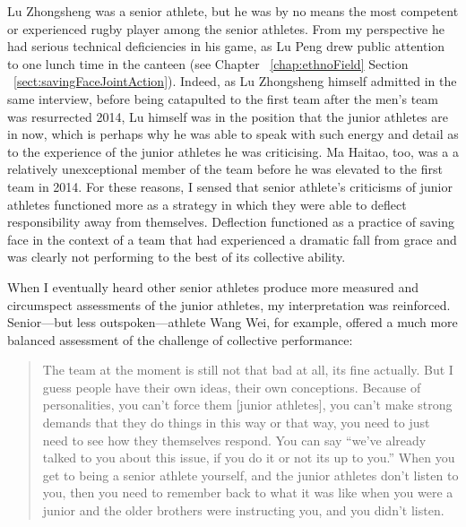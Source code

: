 \begin{CJK}{UTF8}{gbsn}
Lu Zhongsheng was a senior athlete, but he was by no means the most competent or experienced rugby player among the senior athletes.  From my perspective he had serious technical deficiencies in his game, as Lu Peng drew public attention to one lunch time in the canteen (see Chapter ~\ref{chap:ethnoField} Section ~\ref{sect:savingFaceJointAction}).  Indeed, as Lu Zhongsheng himself admitted in the same interview, before being catapulted to the first team after the men's team was resurrected 2014, Lu himself was in the position that the junior athletes are in now, which is perhaps why he was able to speak with such energy and detail as to the experience of the junior athletes he was criticising.  Ma Haitao, too, was a a relatively unexceptional member of the team before he was elevated to the first team in 2014.  For these reasons, I sensed that senior athlete's criticisms of junior athletes functioned more as a strategy in which they were able to deflect responsibility away from themselves.  Deflection functioned as a practice of saving face in the context of a team that had experienced a dramatic fall from grace and was clearly not performing to the best of its collective ability.


When I eventually heard other senior athletes produce more measured and circumspect assessments of the junior athletes, my interpretation was reinforced.  Senior---but less outspoken---athlete Wang Wei, for example, offered a much more balanced assessment of the challenge of collective performance:

\begin{quote}
   The team at the moment is still not that bad at all, its fine actually.  But I guess people have their own ideas, their own conceptions.  Because of personalities, you can't force them [junior athletes], you can't make strong demands that they do things in this way or that way, you need to just need to see how they themselves respond. You can say ``we've already talked to you about this issue, if you do it or not its up to you.''   When you get to being a senior athlete yourself, and the junior athletes don't listen to you, then you need to remember back to what it was like when you were a junior and the older brothers were instructing you, and you didn't listen.


\end{quote}
\end{CJK}
